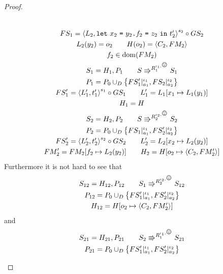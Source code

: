 \begin{proof}
\begin{description}
\begin{equation}
\begin{gathered}
          \\ 
          FS_1 = \xframe{L_2, \Let{x_2}{\FAss{y_2}{f_2}{z_2}}{t'_2}}^{s_2}
          \circ GS_2 \\
          L_2(y_2) = o_2 \andalso H(o_2) = \Obj{C_2, FM_2} \\
          f_2 \in \dom(FM_2) \\
          S_1 = H_1, P_1 \andalso S \Rrightarrow^{R_1^{\iota_1, \smiley}} S_1
          \\
          P_1 = P_0 \cup_D \left\{ FS'_1|_{a_1}^{\iota_1},
          FS_2|_{a_2}^{\iota_2} \right\} \\
          FS'_1 = \xframe{L'_1, t'_1}^{s_1} \circ GS_1  \andalso L'_1 = L_1[x_1 \mapsto
          L_1(y_1)] \\
          H_1 = H
          \\
          S_2 = H_2, P_2 \andalso S \Rrightarrow^{R_2^{\iota_2, \smiley}} S_2
          \\
          P_2 = P_0 \cup_D \left\{ FS_1|_{a_1}^{\iota_1},
          FS'_2|_{a_2}^{\iota_2} \right\} \\
          FS'_2 = \xframe{L'_2, t'_2}^{s_2} \circ GS_2  \andalso L'_2 = L_2[x_2 \mapsto
          L_2(y_2)] \\
          FM'_2 = FM_2[f_2 \mapsto L_2(y_2)] \andalso H_2 = H[o_2 \mapsto
          \Obj{C_2, FM'_2}]
          \\
        \end{gathered}
      \end{equation}
      Furthermore it is not hard to see that 
      \begin{equation}
        \begin{gathered}
          S_{12} = H_{12}, P_{12} \andalso S_1 \Rrightarrow^{R_2^{\iota_2,
          \smiley}} S_{12}
          \\
          P_{12} = P_0 \cup_D \left\{ FS'_1|_{a_1}^{\iota_1},
          FS'_2|_{a_2}^{\iota_2} \right\} \\
          H_{12} = H[o_2 \mapsto \Obj{C_2, FM'_2}]
        \end{gathered}
      \end{equation}
      and 
      \begin{equation}
        \begin{gathered}
          S_{21} = H_{21}, P_{21} \andalso S_2 \Rrightarrow^{R_1^{\iota_1,
          \smiley}} S_{21}
          \\
          P_{21} = P_0 \cup_D \left\{ FS'_1|_{a_1}^{\iota_1},
          FS'_2|_{a_2}^{\iota_2} \right\} \\

\end{gathered}
\end{equation}
\end{description}
\end{proof}
